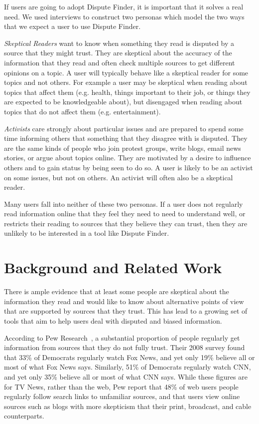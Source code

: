 \documentclass{www2010-submission}
\begin{document}
If users are going to adopt Dispute Finder, it is important that it solves a real need. We used interviews to construct two personas which model the two ways that we expect a user to use Dispute Finder.

{\it Skeptical Readers} want to know when something they read is disputed by a source that they might trust. They are skeptical about the accuracy of the information that they read and often check multiple sources to get different opinions on a topic. A user will typically behave like a skeptical reader for some topics and not others. For example a user may be skeptical when reading about topics that affect them (e.g. health, things important to their job, or things they are expected to be knowledgeable about), but disengaged when reading about topics that do not affect them (e.g. entertainment).

{\it Activists} care strongly about particular issues and are prepared to spend some time informing others that something that they disagree with is disputed. They are the same kinds of people who join protest groups, write blogs, email news stories, or argue about topics online. They are motivated by a desire to influence others and to gain status by being seen to do so. A user is likely to be an activist on some issues, but not on others. An activist will often also be a skeptical reader.

Many users fall into neither of these two personas. If a user does not regularly read information online that they feel they need to need to understand well, or restricts their reading to sources that they believe they can trust, then they are unlikely to be interested in a tool like Dispute Finder.


\section{Background and Related Work}

There is ample evidence that at least some people are skeptical about the information they read and would like to know about alternative points of view that are supported by sources that they trust. This has lead to a growing set of tools that aim to help users deal with disputed and biased information.

According to Pew Research~\cite{PewResearch2008}, a substantial proportion of people regularly get information from sources that they do not fully trust. Their 2008 survey found that 33\% of Democrats regularly watch Fox News, and yet only 19\% believe all or most of what Fox News says. Similarly, 51\% of Democrats regularly watch CNN, and yet only 35\% believe all or most of what CNN says. While these figures are for TV News, rather than the web, Pew report that 48\% of web users people regularly follow search links to unfamiliar sources, and that users view online sources such as blogs with more skepticism that their print, broadcast, and cable counterparts. 
\end{document}
